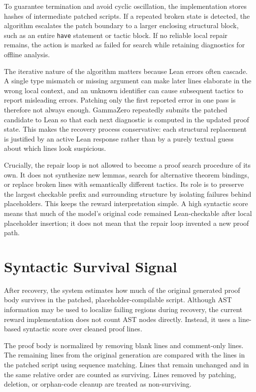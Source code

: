 To guarantee termination and avoid cyclic oscillation, the implementation stores hashes of intermediate patched scripts. If a repeated broken state is detected, the algorithm escalates the patch boundary to a larger enclosing structural block, such as an entire \texttt{have} statement or tactic block. If no reliable local repair remains, the action is marked as failed for search while retaining diagnostics for offline analysis.

The iterative nature of the algorithm matters because Lean errors often cascade. A single type mismatch
or missing argument can make later lines elaborate in the wrong local context, and an unknown identifier
can cause subsequent tactics to report misleading errors. Patching only the first reported error in one
pass is therefore not always enough. GammaZero repeatedly submits the patched candidate to Lean so
that each next diagnostic is computed in the updated proof state. This makes the recovery process
conservative: each structural replacement is justified by an active Lean response rather than by a purely
textual guess about which lines look suspicious.

Crucially, the repair loop is not allowed to become a proof search procedure of its own. It does not
synthesize new lemmas, search for alternative theorem bindings, or replace broken lines with
semantically different tactics. Its role is to preserve the largest checkable prefix and surrounding
structure by isolating failures behind placeholders. This keeps the reward interpretation simple. A high
syntactic score means that much of the model's original code remained Lean-checkable after local
placeholder insertion; it does not mean that the repair loop invented a new proof path.

\section{Syntactic Survival Signal}

After recovery, the system estimates how much of the original generated proof body survives in the
patched, placeholder-compilable script. Although AST information may be used to localize failing
regions during recovery, the current reward implementation does not count AST nodes directly.
Instead, it uses a line-based syntactic score over cleaned proof lines.

The proof body is normalized by removing blank lines and comment-only lines. The remaining lines
from the original generation are compared with the lines in the patched script using sequence matching.
Lines that remain unchanged and in the same relative order are counted as surviving. Lines removed
by patching, deletion, or orphan-code cleanup are treated as non-surviving.

